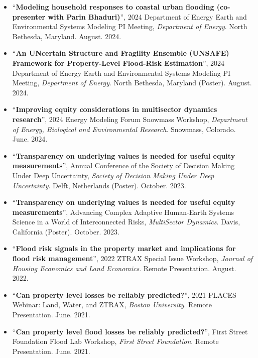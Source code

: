\documentclass[10pt,oneside]{article}
\begin{document}
\begin{itemize}[label={}]
  
  \item \enquote{\textbf{Modeling household responses to coastal urban flooding (co-presenter with Parin Bhaduri)}}, 2024 Department of Energy Earth and Environmental Systems Modeling PI Meeting,  \textit{Department of Energy}. North Bethesda, Maryland.  August. 2024.
        
  \item \enquote{\textbf{An UNcertain Structure and Fragility Ensemble (UNSAFE) Framework for Property-Level Flood-Risk Estimation}}, 2024 Department of Energy Earth and Environmental Systems Modeling PI Meeting,  \textit{Department of Energy}. North Bethesda, Maryland (Poster).  August. 2024.
        
  \item \enquote{\textbf{Improving equity considerations in multisector dynamics research}}, 2024 Energy Modeling Forum Snowmass Workshop,  \textit{Department of Energy, Biological and Environmental Research}. Snowmass, Colorado.  June. 2024.
        
  \item \enquote{\textbf{Transparency on underlying values is needed for useful equity measurements}}, Annual Conference of the Society of Decision Making Under Deep Uncertainty,  \textit{Society of Decision Making Under Deep Uncertainty}. Delft, Netherlands (Poster).  October. 2023.
        
  \item \enquote{\textbf{Transparency on underlying values is needed for useful equity measurements}}, Advancing Complex Adaptive Human-Earth Systems Science in a World of Interconnected Risks,  \textit{MultiSector Dynamics}. Davis, California (Poster).  October. 2023.
        
  \item \enquote{\textbf{Flood risk signals in the property market and implications for flood risk management}}, 2022 ZTRAX Special Issue Workshop,  \textit{Journal of Housing Economics and Land Economics}. Remote Presentation.  August. 2022.
        
  \item \enquote{\textbf{Can property level losses be reliably predicted?}}, 2021 PLACES Webinar: Land, Water, and ZTRAX,  \textit{Boston University}. Remote Presentation.  June. 2021.
        
  \item \enquote{\textbf{Can property level flood losses be reliably predicted?}}, First Street Foundation Flood Lab Workshop,  \textit{First Street Foundation}. Remote Presentation.  June. 2021.
        

\end{itemize}
\end{document}
